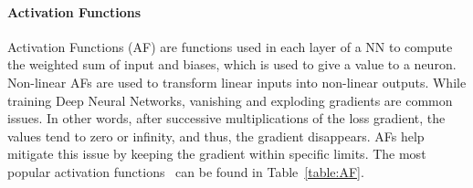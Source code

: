 \paragraph{Activation Functions}

Activation Functions (AF) are functions used in each layer of a NN
to compute the weighted sum of input and biases, which is used to give a value
to a neuron. Non-linear AFs are used to transform linear inputs into non-linear
outputs.  While training Deep Neural Networks, vanishing and exploding
gradients are common issues. In other words, after successive multiplications
of the loss gradient, the values tend to zero or infinity, and thus, the
gradient disappears. AFs help mitigate this issue by keeping the gradient within
specific limits. The most popular activation functions~\cite{dubey2022activation} can be found in
Table~\ref{table:AF}.

\begin{table}[htb]
    \centering
    \linebreak
    \caption{Popular activation functions~\cite{dubey2022activation}}
    \label{table:AF}
	\vspace{\abovecaptionskip}
\end{table}



